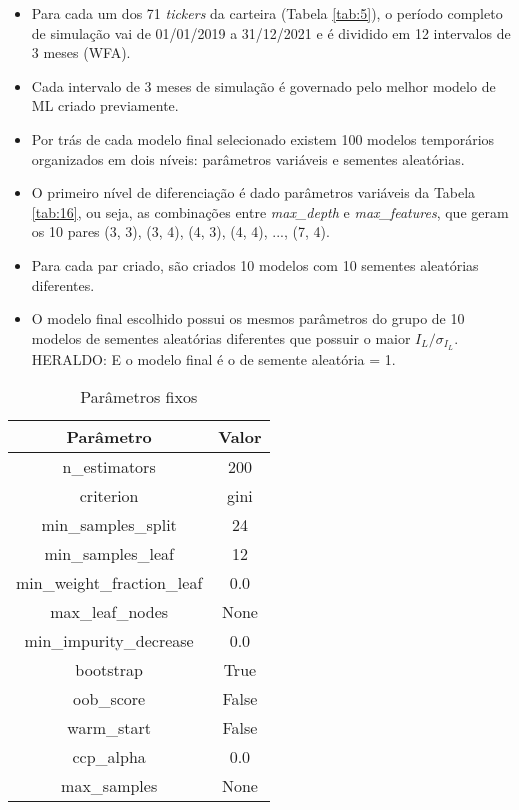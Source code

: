\begin{itemize}
    \item Para cada um dos 71 \textit{tickers} da carteira (Tabela \ref{tab:5}), o período completo de simulação vai de 01/01/2019 a 31/12/2021 e é dividido em 12 intervalos de 3 meses (WFA).

    \item Cada intervalo de 3 meses de simulação é governado pelo melhor modelo de ML criado previamente.

    \item Por trás de cada modelo final selecionado existem 100 modelos temporários organizados em dois níveis: parâmetros variáveis e sementes aleatórias.

    \item O primeiro nível de diferenciação é dado parâmetros variáveis da Tabela \ref{tab:16}, ou seja, as combinações entre \textit{max\_depth} e \textit{max\_features}, que geram os 10 pares (3, 3), (3, 4), (4, 3), (4, 4), ..., (7, 4).

    \item Para cada par criado, são criados 10 modelos com 10 sementes aleatórias diferentes.

    \item O modelo final escolhido possui os mesmos parâmetros do grupo de 10 modelos de sementes aleatórias diferentes que possuir o maior \begin{math} I_L / \sigma_{I_L} \end{math}. \color{red} HERALDO: E o modelo final é o de semente aleatória = 1. \color{black}
\end{itemize}

\begin{table}[!htb]
    \begin{center}
        \begin{tabular}{ c|c }
            Parâmetro & Valor \\
            \hline
            n\_estimators & 200 \\
            criterion & gini \\
            min\_samples\_split & 24 \\
            min\_samples\_leaf & 12 \\
            min\_weight\_fraction\_leaf & 0.0 \\
            max\_leaf\_nodes & None \\
            min\_impurity\_decrease & 0.0 \\
            bootstrap & True \\
            oob\_score & False \\
            warm\_start & False \\
            ccp\_alpha & 0.0 \\
            max\_samples & None \\
        \end{tabular}
        \caption{Parâmetros fixos}
        \label{tab:15}
    \end{center}
\end{table}

